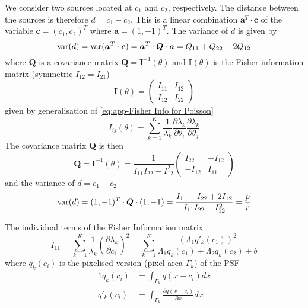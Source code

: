 We consider two sources located at $c_1$ and $c_2$, respectively. The distance between the sources is therefore $d=c_1-c_2$. This is a linear combination $\bm{a}^T\cdot\bm{c}$ of the variable $\bm{c}=(c_1,c_2)^T$ where $\bm{a}=(1,-1)^T$. The variance of $d$ is given by 
%
\begin{equation}
	\mathrm{var}(d)=\mathrm{var}(\bm{a}^T\cdot\bm{c})=\bm{a}^T\cdot\bm{Q}\cdot\bm{a}=Q_{11}+Q_{22}-2Q_{12}
\end{equation}
%
where $\bm{Q}$ is a covariance matrix $\bm{Q}=\bm{I}^{-1}(\theta)$ and $\bm{I}(\theta)$ is the Fisher information matrix (symmetric
$I_{12}=I_{21}$)
%
\begin{equation}
	\bm{I}(\theta)=\left(
	\begin{array}{cc}
		I_{11} & I_{12}\\
		I_{12} & I_{22}
	\end{array}\right)
\end{equation}
%
given by generalisation of \autoref{eq:app-Fisher Info for Poisson}
%
\begin{equation}
	I_{ij}(\theta)=\sum_{k=1}^K\frac{1}{\lambda_k}\frac{\partial\lambda_k}{\partial\theta_i}\frac{\partial\lambda_k}{\partial\theta_j}
	\label{eq:app-Fisher Info gerneral lambda}
\end{equation}
%
The covariance matrix $\bm{Q}$ is then 
%
\begin{equation}
	\bm{Q}=\bm{I}^{-1}(\theta)=\frac{1}{I_{11}I_{22}-I_{12}^2}\left(
	\begin{array}{cc}
		I_{22} & -I_{12}\\
		-I_{12} & I_{11}
	\end{array}\right)
\end{equation}
%
and the variance of $d=c_1-c_2$ 
%
\begin{equation}
	\mathrm{var}(d)=(1,-1)^T\cdot\bm{Q}\cdot(1,-1)=\frac{I_{11}+I_{22}+2I_{12}}{I_{11}I_{22}-I_{12}^2}=\frac{p}{r}
	\label{eq:app-variance alternative}
\end{equation}

The individual terms of the Fisher Information matrix 
%
\begin{equation}
	I_{11}=\sum_{k=1}^K\frac{1}{\lambda_k}\left(\frac{\partial\lambda_k}{\partial c_1}\right)^2=\sum_{k=1}^K\frac{\left(\Lambda_1q'_k(c_1)\right)^2}{\Lambda_1q_k(c_1)+\Lambda_2q_k(c_2)+b}
\end{equation}
%
where $q_k(c_i)$ is the pixelised version (pixel area $\Gamma_k$) of the PSF
%
\begin{alignat*}{1}
	q_k(c_i) & =\int_{\Gamma_k}q(x-c_i)dx\\
	q'_k(c_i) & =\int_{\Gamma_k}\frac{\partial q(x-c_i)}{\partial x}dx
\end{alignat*}

